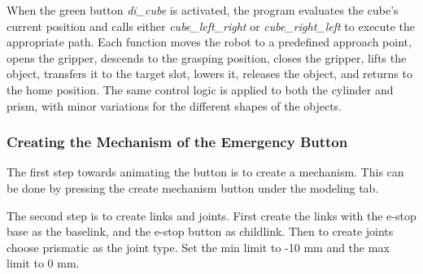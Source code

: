 \documentclass[a4paper,12pt]{article}
\begin{document}
When the green button \textit{di\_cube} is activated, the program evaluates the cube’s current position and calls either \textit{cube\_left\_right} or \textit{cube\_right\_left} to execute the appropriate path. Each function moves the robot to a predefined approach point, opens the gripper, descends to the grasping position, closes the gripper, lifts the object, transfers it to the target slot, lowers it, releases the object, and returns to the home position. The same control logic is applied to both the cylinder and prism, with minor variations for the different shapes of the objects.

\subsubsection{Creating the Mechanism of the Emergency Button}

The first step towards animating the button is to create a mechanism. This can be done by pressing the create mechanism button under the modeling tab.

The second step is to create links and joints. First create the links with the e-stop base as the baselink, and the e-stop button as childlink. Then to create joints choose prismatic as the joint type. Set the min limit to -10 mm and the max limit to 0 mm.
\end{document}
